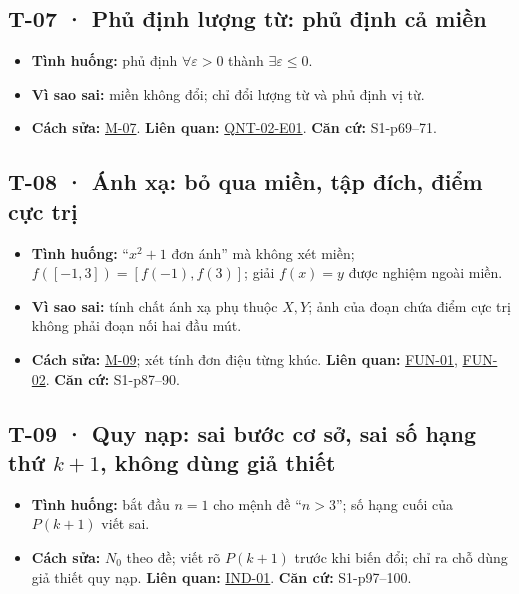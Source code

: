 \documentclass[
  10pt,
  twoside,openany]{book}
\providecommand{\tightlist}{%
  \setlength{\itemsep}{0pt}\setlength{\parskip}{0pt}}
\begin{document}
\hypertarget{T-07}{%
\subsection{T-07 · Phủ định lượng từ: phủ định cả miền}\label{T-07}}

\begin{itemize}
\tightlist
\item
  \textbf{Tình huống:} phủ định \(\forall\varepsilon>0\) thành
  \(\exists\varepsilon\le0\).
\item
  \textbf{Vì sao sai:} miền không đổi; chỉ đổi lượng từ và phủ định vị
  từ.
\item
  \textbf{Cách sửa:} \protect\hyperlink{M-07}{M-07}. \textbf{Liên quan:}
  \protect\hyperlink{QNT-02-E01}{QNT-02-E01}. \textbf{Căn cứ:}
  S1-p69--71.
\end{itemize}

\hypertarget{T-08}{%
\subsection{T-08 · Ánh xạ: bỏ qua miền, tập đích, điểm cực
trị}\label{T-08}}

\begin{itemize}
\tightlist
\item
  \textbf{Tình huống:} ``\(x^2+1\) đơn ánh'' mà không xét miền;
  \(f([-1,3])=[f(-1),f(3)]\); giải \(f(x)=y\) được nghiệm ngoài miền.
\item
  \textbf{Vì sao sai:} tính chất ánh xạ phụ thuộc \(X,Y\); ảnh của đoạn
  chứa điểm cực trị không phải đoạn nối hai đầu mút.
\item
  \textbf{Cách sửa:} \protect\hyperlink{M-09}{M-09}; xét tính đơn điệu
  từng khúc. \textbf{Liên quan:} \protect\hyperlink{FUN-01}{FUN-01},
  \protect\hyperlink{FUN-02}{FUN-02}. \textbf{Căn cứ:} S1-p87--90.
\end{itemize}

\hypertarget{T-09}{%
\subsection{\texorpdfstring{T-09 · Quy nạp: sai bước cơ sở, sai số hạng
thứ \(k+1\), không dùng giả
thiết}{T-09 · Quy nạp: sai bước cơ sở, sai số hạng thứ k+1, không dùng giả thiết}}\label{T-09}}

\begin{itemize}
\tightlist
\item
  \textbf{Tình huống:} bắt đầu \(n=1\) cho mệnh đề ``\(n>3\)''; số hạng
  cuối của \(P(k+1)\) viết sai.
\item
  \textbf{Cách sửa:} \(N_0\) theo đề; viết rõ \(P(k+1)\) trước khi biến
  đổi; chỉ ra chỗ dùng giả thiết quy nạp. \textbf{Liên quan:}
  \protect\hyperlink{IND-01}{IND-01}. \textbf{Căn cứ:} S1-p97--100.
\end{itemize}
\end{document}

